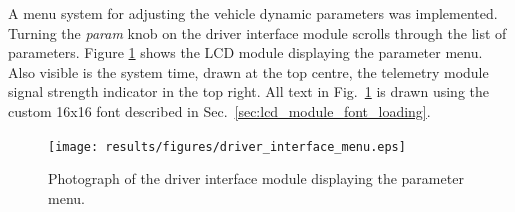 A menu system for adjusting the vehicle dynamic parameters was implemented. Turning the \emph{param} knob on the driver interface module scrolls through the list of parameters. Figure \ref{fig:driver_interface_menu} shows the LCD module displaying the parameter menu. Also visible is the system time, drawn at the top centre, the telemetry module signal strength indicator in the top right. All text in Fig.\ \ref{fig:driver_interface_menu} is drawn using the custom 16x16 font described in Sec.\ \ref{sec:lcd_module_font_loading}.

\begin{figure}[h!]
 \centering
 \texttt{[image: results/figures/driver\_interface\_menu.eps]}
 \caption{Photograph of the driver interface module displaying the parameter menu.}
 \label{fig:driver_interface_menu}
\end{figure}

